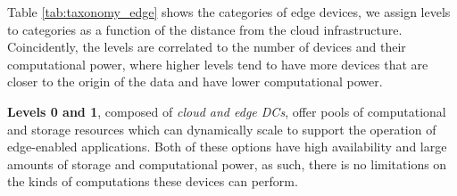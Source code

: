 \begin{table}[!htb]
    \caption{Taxonomy of the edge environment}
    \begin{minipage}{.45\linewidth}
        \centering
    \end{minipage} %
    \begin{minipage}{.45\linewidth}
        \centering
    \end{minipage} 
    \label{tab:taxonomy_edge}
\end{table}

Table \ref{tab:taxonomy_edge} shows the categories of edge devices, we assign levels to categories as a function of the distance from the cloud infrastructure. Coincidently, the levels are correlated to the number of devices and their computational power, where higher levels tend to have more devices that are closer to the origin of the data and have lower computational power.

\textbf{Levels 0 and 1}, composed of \textit{cloud and edge DCs}, offer pools of computational and storage resources which can dynamically scale to support the operation of edge-enabled applications. Both of these options have high availability and large amounts of storage and computational power, as such, there is no limitations on the kinds of computations these devices can perform.

